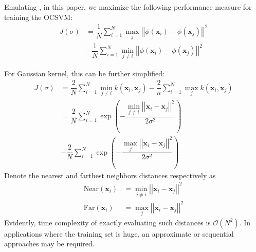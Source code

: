 \documentclass[conference]{IEEEtran}
\begin{document}
Emulating \cite{Xiao2014}, in this paper, we maximize the following performance measure for training the OCSVM:
\begin{align}
J (\sigma) &= \dfrac{1}{N} \sum _{i=1}^N \max_j \left|\left| \phi \left( \mathbf{x}_i \right) - \phi \left( \mathbf{x}_j \right) \right|\right|^2 \nonumber \\
&- \dfrac{1}{N} \sum _{i=1}^N \min_{j \ne i} \left|\left| \phi \left( \mathbf{x}_i \right) - \phi \left( \mathbf{x}_j \right) \right|\right|^2 
\end{align}

For Gaussian kernel, this can be further simplified:
\begin{subequations}
\begin{align}
J (\sigma) &= \dfrac{2}{N} \sum _{i=1}^N \min_{j \ne i}  k \left( \mathbf{x}_i, \mathbf{x}_j\right) - \dfrac{2}{n} \sum _{i=1}^N \max_{j}  k \left( \mathbf{x}_i, \mathbf{x}_j\right) \\
&=\dfrac{2}{N} \sum _{i=1}^N \exp \left( - \dfrac{\min_{j \ne i} \left|\left| \mathbf{x}_i - \mathbf{x}_j \right|\right|^2}{2 \sigma^2}  \right) \nonumber \\
&- \dfrac{2}{N} \sum _{i=1}^N \exp \left( - \dfrac{\max_j \left|\left| \mathbf{x}_i - \mathbf{x}_j \right|\right|^2}{2 \sigma^2}  \right) 
\end{align}
\end{subequations}
Denote the nearest  and farthest neighbors distances respectively as 
\begin{subequations}
\begin{align}
\text{Near} \left( \mathbf{x}_i \right)&=\min_{j \ne i} \left|\left| \mathbf{x}_i - \mathbf{x}_j \right|\right|^2 \label{eq:near_dist} \\
\text{Far} \left( \mathbf{x}_i \right)&=\max_j \left|\left| \mathbf{x}_i - \mathbf{x}_j \right|\right|^2 \label{eq:far_dist}
\end{align}
\end{subequations}
Evidently, time complexity of exactly evaluating such distances is $\mathcal{O}(N^2)$. In applications where the training set is huge, an approximate or sequential approaches may be required.
\end{document}
